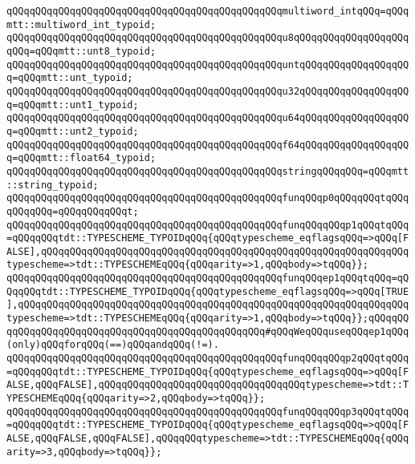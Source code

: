 \verb|qQQqqQQqqQQqqQQqqQQqqQQqqQQqqQQqqQQqqQQqqQQqqQQqmultiword_intqQQq=qQQqmtt::multiword_int_typoid;|\newline
\newline
\verb|qQQqqQQqqQQqqQQqqQQqqQQqqQQqqQQqqQQqqQQqqQQqqQQqu8qQQqqQQqqQQqqQQqqQQqqQQq=qQQqmtt::unt8_typoid;|\newline
\verb|qQQqqQQqqQQqqQQqqQQqqQQqqQQqqQQqqQQqqQQqqQQqqQQquntqQQqqQQqqQQqqQQqqQQq=qQQqmtt::unt_typoid;|\newline
\verb|qQQqqQQqqQQqqQQqqQQqqQQqqQQqqQQqqQQqqQQqqQQqqQQqu32qQQqqQQqqQQqqQQqqQQq=qQQqmtt::unt1_typoid;|\newline
\newline
\verb|qQQqqQQqqQQqqQQqqQQqqQQqqQQqqQQqqQQqqQQqqQQqqQQqu64qQQqqQQqqQQqqQQqqQQq=qQQqmtt::unt2_typoid;|\newline
\verb|qQQqqQQqqQQqqQQqqQQqqQQqqQQqqQQqqQQqqQQqqQQqqQQqf64qQQqqQQqqQQqqQQqqQQq=qQQqmtt::float64_typoid;|\newline
\verb|qQQqqQQqqQQqqQQqqQQqqQQqqQQqqQQqqQQqqQQqqQQqqQQqstringqQQqqQQq=qQQqmtt::string_typoid;|\newline
\newline
\verb|qQQqqQQqqQQqqQQqqQQqqQQqqQQqqQQqqQQqqQQqqQQqqQQqfunqQQqp0qQQqqQQqtqQQqqQQqqQQq=qQQqqQQqqQQqt;|\newline
\newline
\verb|qQQqqQQqqQQqqQQqqQQqqQQqqQQqqQQqqQQqqQQqqQQqqQQqfunqQQqqQQqp1qQQqtqQQq=qQQqqQQqtdt::TYPESCHEME_TYPOIDqQQq{qQQqtypescheme_eqflagsqQQq=>qQQq[FALSE],qQQqqQQqqQQqqQQqqQQqqQQqqQQqqQQqqQQqqQQqqQQqqQQqqQQqqQQqqQQqqQQqtypescheme=>tdt::TYPESCHEMEqQQq{qQQqarity=>1,qQQqbody=>tqQQq}};|\newline
\verb|qQQqqQQqqQQqqQQqqQQqqQQqqQQqqQQqqQQqqQQqqQQqqQQqfunqQQqep1qQQqtqQQq=qQQqqQQqtdt::TYPESCHEME_TYPOIDqQQq{qQQqtypescheme_eqflagsqQQq=>qQQq[TRUE],qQQqqQQqqQQqqQQqqQQqqQQqqQQqqQQqqQQqqQQqqQQqqQQqqQQqqQQqqQQqqQQqqQQqtypescheme=>tdt::TYPESCHEMEqQQq{qQQqarity=>1,qQQqbody=>tqQQq}};qQQqqQQqqQQqqQQqqQQqqQQqqQQqqQQqqQQqqQQqqQQqqQQqqQQq#qQQqWeqQQquseqQQqep1qQQq(only)qQQqforqQQq(==)qQQqandqQQq(!=).|\newline
\verb|qQQqqQQqqQQqqQQqqQQqqQQqqQQqqQQqqQQqqQQqqQQqqQQqfunqQQqqQQqp2qQQqtqQQq=qQQqqQQqtdt::TYPESCHEME_TYPOIDqQQq{qQQqtypescheme_eqflagsqQQq=>qQQq[FALSE,qQQqFALSE],qQQqqQQqqQQqqQQqqQQqqQQqqQQqqQQqqQQqtypescheme=>tdt::TYPESCHEMEqQQq{qQQqarity=>2,qQQqbody=>tqQQq}};|\newline
\verb|qQQqqQQqqQQqqQQqqQQqqQQqqQQqqQQqqQQqqQQqqQQqqQQqfunqQQqqQQqp3qQQqtqQQq=qQQqqQQqtdt::TYPESCHEME_TYPOIDqQQq{qQQqtypescheme_eqflagsqQQq=>qQQq[FALSE,qQQqFALSE,qQQqFALSE],qQQqqQQqtypescheme=>tdt::TYPESCHEMEqQQq{qQQqarity=>3,qQQqbody=>tqQQq}};|\newline
